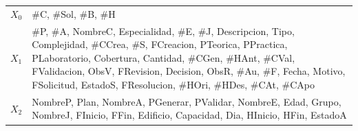 {\footnotesize\filas
\begin{xltabular}{\linewidth}{l L{1}}
 &  \\
\endhead
$X_0$ & \#C, \#Sol, \#B, \#H \\
$X_{1}$ & \#P, \#A, NombreC, Especialidad, \#E, \#J, Descripcion, Tipo, Complejidad, \#CCrea, \#S, FCreacion, PTeorica, PPractica, PLaboratorio, Cobertura, Cantidad, \#CGen, \#HAnt, \#CVal, FValidacion, ObsV, FRevision, Decision, ObsR, \#Au, \#F, Fecha, Motivo, FSolicitud, EstadoS, FResolucion, \#HOri, \#HDes, \#CAt, \#CApo \\
$X_{2}$ & NombreP, Plan, NombreA, PGenerar, PValidar, NombreE, Edad, Grupo, NombreJ, FInicio, FFin, Edificio, Capacidad, Dia, HInicio, HFin, EstadoA \\
\end{xltabular}}
